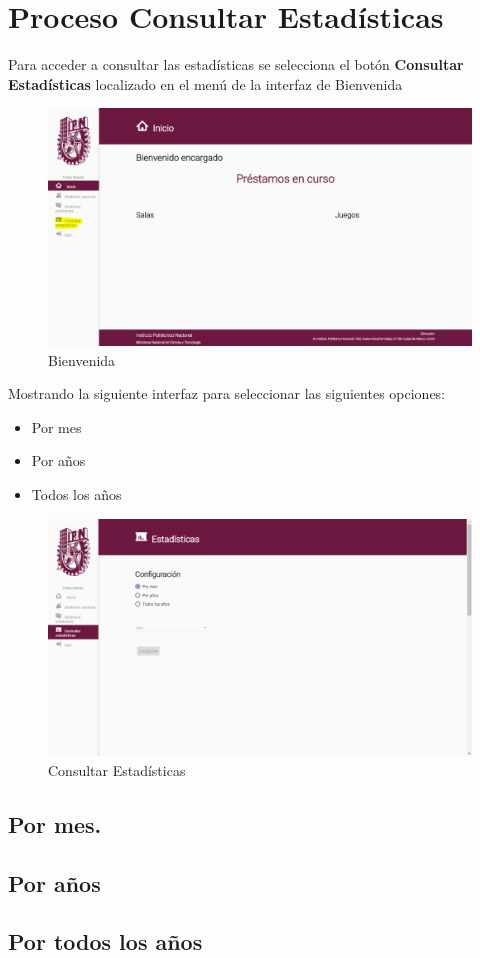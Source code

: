 \chapter{Proceso Consultar Estadísticas }
	Para acceder a consultar las estadísticas se selecciona el botón 
	\textbf{Consultar Estadísticas} localizado en el menú de la interfaz de 
	Bienvenida 
	\begin{figure}[hbtp]

	\includegraphics[scale=0.3]{images/Interfaz/IUGS15_binevenida.PNG}
	\caption{Bienvenida}
	\end{figure}
		
	Mostrando la siguiente interfaz para seleccionar las siguientes 
	opciones:
	\begin{itemize}
		\item Por mes
		\item Por años
		\item Todos los años 
	\end{itemize}
	
	\begin{figure}[hbtp]

	\includegraphics[scale=0.3]{images/Interfaz/IUGS15_estadisticas.PNG}
	\caption{Consultar Estadísticas}
	\end{figure}
	

\section{Por mes.}
	

\section{Por años}
	


\section{Por todos los años}
	
